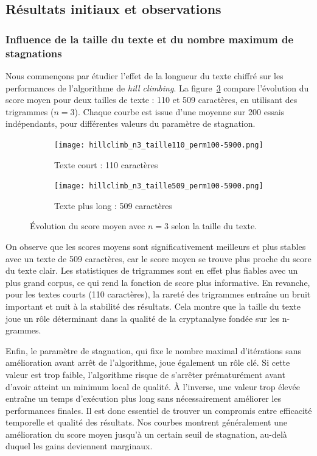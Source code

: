 \documentclass[a4paper]{article}
\begin{document}
\subsection{Résultats initiaux et observations}

\subsubsection{Influence de la taille du texte et du nombre maximum de stagnations}

Nous commençons par étudier l’effet de la longueur du texte chiffré sur les performances de l’algorithme de \textit{hill climbing}. La figure~\ref{fig:n3-tailles} compare l’évolution du score moyen pour deux tailles de texte : 110 et 509 caractères, en utilisant des trigrammes ($n = 3$). Chaque courbe est issue d’une moyenne sur 200 essais indépendants, pour différentes valeurs du paramètre de stagnation.

\begin{figure}[H]
    \centering
    \begin{subfigure}[b]{0.45\textwidth}
        \texttt{[image: hillclimb\_n3\_taille110\_perm100-5900.png]}
        \caption{Texte court : 110 caractères}
        \label{fig:n3-110}
    \end{subfigure}
    \hfill
    \begin{subfigure}[b]{0.45\textwidth}
        \texttt{[image: hillclimb\_n3\_taille509\_perm100-5900.png]}
        \caption{Texte plus long : 509 caractères}
        \label{fig:n3-509}
    \end{subfigure}
    \caption{Évolution du score moyen avec $n = 3$ selon la taille du texte.}
    \label{fig:n3-tailles}
\end{figure}

On observe que les scores moyens sont significativement meilleurs et plus stables avec un texte
de 509 caractères, car le score moyen se trouve plus proche du score du texte clair. Les statistiques
de trigrammes sont en effet plus fiables avec un plus grand corpus, ce qui rend la fonction de score
plus informative. En revanche, pour les textes courts (110 caractères), la rareté des trigrammes
entraîne un bruit important et nuit à la stabilité des résultats. Cela montre que la taille du texte
joue un rôle déterminant dans la qualité de la cryptanalyse fondée sur les n-grammes.

Enfin, le paramètre de stagnation, qui fixe le nombre maximal d’itérations sans amélioration
avant arrêt de l’algorithme, joue également un rôle clé. Si cette valeur est trop faible, l’algorithme
risque de s’arrêter prématurément avant d’avoir atteint un minimum local de qualité. À l’inverse,
une valeur trop élevée entraîne un temps d’exécution plus long sans nécessairement améliorer les
performances finales. Il est donc essentiel de trouver un compromis entre efficacité temporelle et
qualité des résultats. Nos courbes montrent généralement une amélioration du score moyen jusqu’à
un certain seuil de stagnation, au-delà duquel les gains deviennent marginaux.
\end{document}
